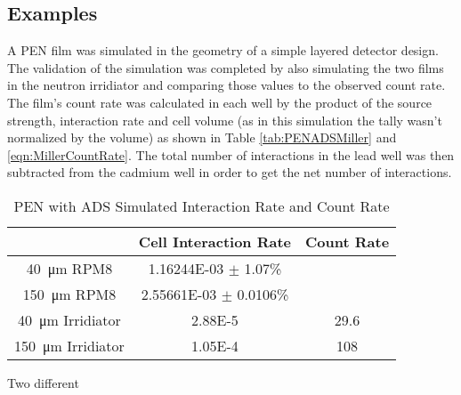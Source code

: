 \documentclass[draftcls,onecolumn]{IEEEtran}
\begin{document}
\subsection{Examples}
\begin{Exercise*}[label={PEN LiF with ADS},title={PEN LiF film with ADS},name={Example}]

A PEN film was simulated in the geometry of a simple layered detector design.
The validation of the simulation was completed by also simulating the two films in the neutron irridiator and comparing those values to the observed count rate.
The film's count rate was calculated in each well by the product of the source strength, interaction rate and cell volume (as in this simulation the tally wasn't normalized by the volume) as shown in Table \ref{tab:PENADSMiller} and \eqref{eqn:MillerCountRate}.
The total number of interactions in the lead well was then subtracted from the cadmium well in order to get the net number of interactions.
\begin{table}
  \centering
  \caption{PEN with ADS Simulated Interaction Rate and Count Rate}
  \label{tab:PENADPerformace}
  \begin{tabular}{c | c c}
    & Cell Interaction Rate & Count Rate \\
    \hline
    \hline
   \SI{40}{\um}  RPM8 & \num{1.16244E-03} $\pm$ 1.07\% & \\
   \SI{150}{\um} RPM8 & \num{2.55661E-03} $\pm$ 0.0106\% & \\
   \hline
   \SI{40}{\um}  Irridiator & \num{2.88E-5} & 29.6 \\
   \SI{150}{\um} Irridiator & \num{1.05E-4} & 108 \\
  \end{tabular}
\end{table}

Two different


\end{Exercise*}
\end{document}
